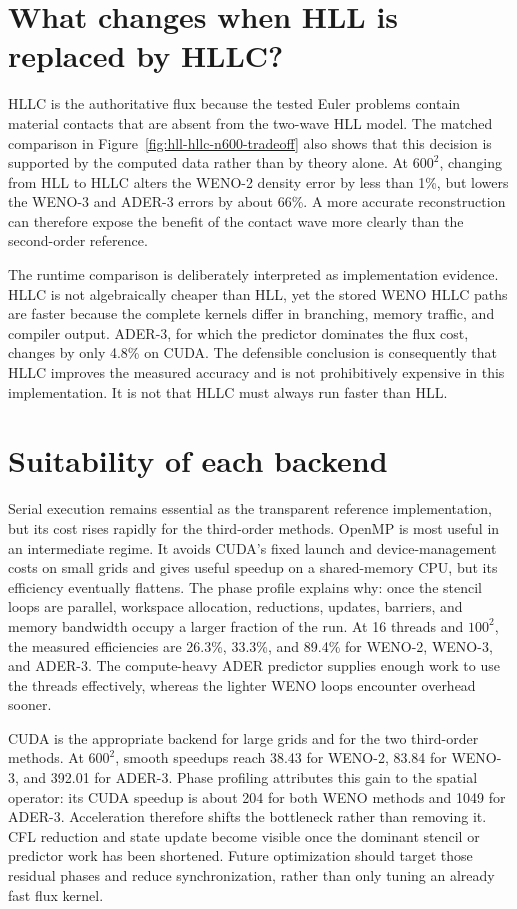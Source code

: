 \section{What changes when HLL is replaced by HLLC?}

HLLC is the authoritative flux because the tested Euler problems contain material contacts
that are absent from the two-wave HLL model.  The matched comparison in
Figure~\ref{fig:hll-hllc-n600-tradeoff} also shows that this decision is supported by the
computed data rather than by theory alone.  At \(600^2\), changing from HLL to HLLC alters
the WENO-2 density error by less than 1\%, but lowers the WENO-3 and ADER-3 errors by about
66\%.  A more accurate reconstruction can therefore expose the benefit of the contact wave
more clearly than the second-order reference.

The runtime comparison is deliberately interpreted as implementation evidence.  HLLC is
not algebraically cheaper than HLL, yet the stored WENO HLLC paths are faster because the
complete kernels differ in branching, memory traffic, and compiler output.  ADER-3, for
which the predictor dominates the flux cost, changes by only 4.8\% on CUDA.  The defensible
conclusion is consequently that HLLC improves the measured accuracy and is not prohibitively
expensive in this implementation. It is not that HLLC must always run faster than HLL.

\section{Suitability of each backend}

Serial execution remains essential as the transparent reference implementation, but its
cost rises rapidly for the third-order methods.  OpenMP is most useful in an intermediate
regime.  It avoids CUDA's fixed launch and device-management costs on small grids and gives
useful speedup on a shared-memory CPU, but its efficiency eventually flattens.  The phase
profile explains why: once the stencil loops are parallel, workspace allocation, reductions,
updates, barriers, and memory bandwidth occupy a larger fraction of the run.  At 16 threads
and \(100^2\), the measured efficiencies are 26.3\%, 33.3\%, and 89.4\% for WENO-2,
WENO-3, and ADER-3.  The compute-heavy ADER predictor supplies enough work to use the
threads effectively, whereas the lighter WENO loops encounter overhead sooner.

CUDA is the appropriate backend for large grids and for the two third-order methods.  At
\(600^2\), smooth speedups reach 38.43 for WENO-2, 83.84 for WENO-3, and 392.01 for
ADER-3.  Phase profiling attributes this gain to the spatial operator: its CUDA speedup is
about 204 for both WENO methods and 1049 for ADER-3.  Acceleration therefore shifts the
bottleneck rather than removing it.  CFL reduction and state update become visible once the
dominant stencil or predictor work has been shortened.  Future optimization should target
those residual phases and reduce synchronization, rather than only tuning an already fast
flux kernel.

